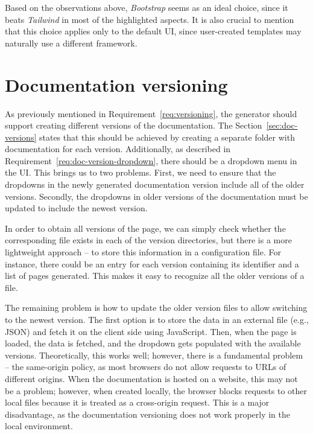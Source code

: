 Based on the observations above, \textit{Bootstrap} seems as an ideal choice, since it beats \textit{Tailwind} in most of the highlighted aspects.
It is also crucial to mention that this choice applies only to the default UI, since user-created templates may naturally use a different framework.

\section{Documentation versioning}
\label{sec:documentation-versioning-three}

As previously mentioned in Requirement~\ref{req:versioning}, the generator should support creating different versions of the documentation.
The Section~\ref{sec:doc-versions} states that this should be achieved by creating a separate folder with documentation for each version.
Additionally, as described in Requirement~\ref{req:doc-version-dropdown}, there should be a dropdown menu in the UI.
This brings us to two problems.
First, we need to ensure that the dropdowns in the newly generated documentation version include all of the older versions.
Secondly, the dropdowns in older versions of the documentation must be updated to include the newest version.

In order to obtain all versions of the page, we can simply check whether the corresponding file exists in each of the version directories, but there is a more lightweight approach -- to store this information in a configuration file.
For instance, there could be an entry for each version containing its identifier and a list of pages generated.
This makes it easy to recognize all the older versions of a file.

The remaining problem is how to update the older version files to allow switching to the newest version.
The first option is to store the data in an external file (e.g., JSON) and fetch it on the client side using JavaScript. 
Then, when the page is loaded, the data is fetched, and the dropdown gets populated with the available versions.
Theoretically, this works well; however, there is a fundamental problem -- the same-origin policy, as most browsers do not allow requests to URLs of different origins.
When the documentation is hosted on a website, this may not be a problem; however, when created locally, the browser blocks requests to other local files because it is treated as a cross-origin request.
This is a major disadvantage, as the documentation versioning does not work properly in the local environment.

